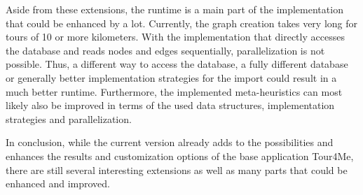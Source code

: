 Aside from these extensions, the runtime is a main part of the implementation that could be enhanced by a lot. 
Currently, the graph creation takes very long for tours of 10 or more kilometers.
With the implementation that directly accesses the database and reads nodes and edges sequentially, parallelization is not possible.
Thus, a different way to access the database, a fully different database or generally better implementation strategies for the import could result in a much better runtime.
Furthermore, the implemented meta-heuristics can most likely also be improved in terms of the used data structures, implementation strategies and parallelization.

In conclusion, while the current version already adds to the possibilities and enhances the results and customization options of the base application Tour4Me, there are still several interesting extensions as well as many parts that could be enhanced and improved.



